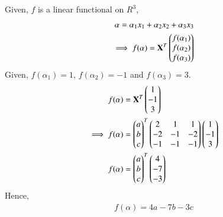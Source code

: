Given, $f$ is a linear functional on $R^3$,
\begin{align}
\mathbf{\alpha} = \alpha_1 x_1 + \alpha_2 x_2 + \alpha_3 x_3\\
\implies f(\alpha) = \mathbf{X}^T \begin{pmatrix}f(\alpha_1)\\f(\alpha_2)\\f(\alpha_3)\end{pmatrix}
\end{align}
Given, $f(\alpha_1)=1$, $f(\alpha_2)=-1$ and $f(\alpha_3)=3$.
\begin{align}
 f(\alpha) &= \mathbf{X}^T \begin{pmatrix}1\\-1\\3\end{pmatrix}\\
\implies f(\alpha) &= \begin{pmatrix}a\\b\\c\end{pmatrix}^T\begin{pmatrix}2 &1&1\\-2&-1&-2 \\-1&-1&-1\end{pmatrix}\begin{pmatrix}1\\-1\\3\end{pmatrix}\\
f(\alpha)&=\begin{pmatrix}a\\b\\c\end{pmatrix}^T\begin{pmatrix}4\\-7\\-3\end{pmatrix}
\end{align}
Hence,
\begin{align}
f(\alpha)=4a-7b-3c
\end{align}

